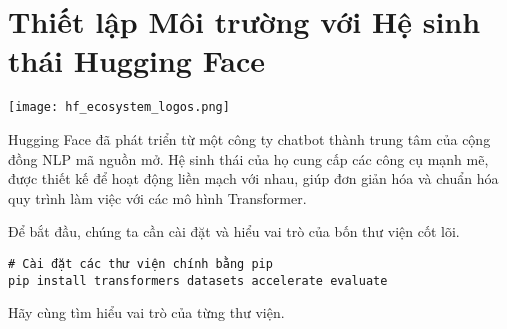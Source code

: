
\section{Thiết lập Môi trường với Hệ sinh thái Hugging Face}
\label{sec:hf_ecosystem}

\begin{center}
    \texttt{[image: hf\_ecosystem\_logos.png]}
    \label{fig:hf_ecosystem_logos}
\end{center}

Hugging Face đã phát triển từ một công ty chatbot thành trung tâm của cộng đồng NLP mã nguồn mở. Hệ sinh thái của họ cung cấp các công cụ mạnh mẽ, được thiết kế để hoạt động liền mạch với nhau, giúp đơn giản hóa và chuẩn hóa quy trình làm việc với các mô hình Transformer.

Để bắt đầu, chúng ta cần cài đặt và hiểu vai trò của bốn thư viện cốt lõi.

\begin{verbatim}
# Cài đặt các thư viện chính bằng pip
pip install transformers datasets accelerate evaluate
\end{verbatim}

Hãy cùng tìm hiểu vai trò của từng thư viện.

